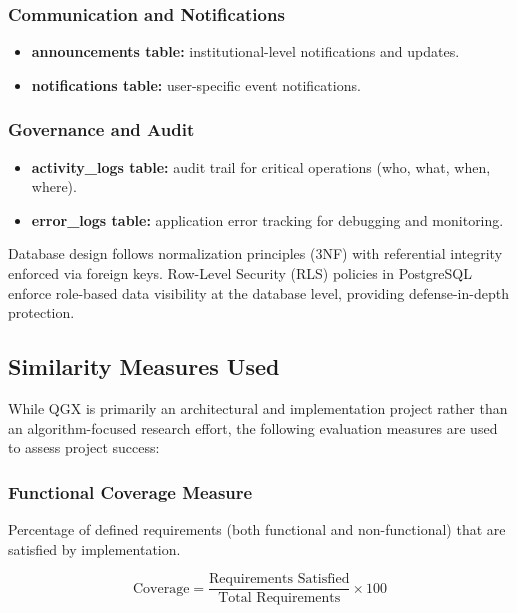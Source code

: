 \documentclass[11pt,a4paper]{article}
\begin{document}
\subsubsection{Communication and Notifications}

\begin{itemize}
    \item \textbf{announcements table:} institutional-level notifications and updates.
    \item \textbf{notifications table:} user-specific event notifications.
\end{itemize}

\subsubsection{Governance and Audit}

\begin{itemize}
    \item \textbf{activity\_logs table:} audit trail for critical operations (who, what, when, where).
    \item \textbf{error\_logs table:} application error tracking for debugging and monitoring.
\end{itemize}

Database design follows normalization principles (3NF) with referential integrity enforced via foreign keys. Row-Level Security (RLS) policies in PostgreSQL enforce role-based data visibility at the database level, providing defense-in-depth protection.

\subsection{Similarity Measures Used}

While QGX is primarily an architectural and implementation project rather than an algorithm-focused research effort, the following evaluation measures are used to assess project success:

\subsubsection{Functional Coverage Measure}

Percentage of defined requirements (both functional and non-functional) that are satisfied by implementation.

\begin{equation}
\text{Coverage} = \frac{\text{Requirements Satisfied}}{\text{Total Requirements}} \times 100
\end{equation}
\end{document}
